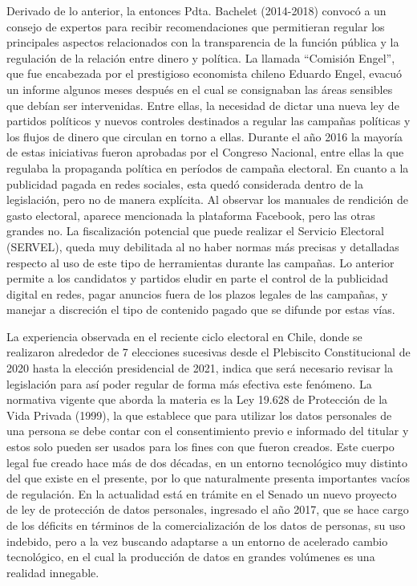 \documentclass[
  10pt,
  letterpaper,
]{report}
\begin{document}
Derivado de lo anterior, la entonces Pdta. Bachelet (2014-2018) convocó
a un consejo de expertos para recibir recomendaciones que permitieran
regular los principales aspectos relacionados con la transparencia de la
función pública y la regulación de la relación entre dinero y política.
La llamada ``Comisión Engel'', que fue encabezada por el prestigioso
economista chileno Eduardo Engel, evacuó un informe algunos meses
después en el cual se consignaban las áreas sensibles que debían ser
intervenidas. Entre ellas, la necesidad de dictar una nueva ley de
partidos políticos y nuevos controles destinados a regular las campañas
políticas y los flujos de dinero que circulan en torno a ellas. Durante
el año 2016 la mayoría de estas iniciativas fueron aprobadas por el
Congreso Nacional, entre ellas la que regulaba la propaganda política en
períodos de campaña electoral. En cuanto a la publicidad pagada en redes
sociales, esta quedó considerada dentro de la legislación, pero no de
manera explícita. Al observar los manuales de rendición de gasto
electoral, aparece mencionada la plataforma Facebook, pero las otras
grandes no. La fiscalización potencial que puede realizar el Servicio
Electoral (SERVEL), queda muy debilitada al no haber normas más precisas
y detalladas respecto al uso de este tipo de herramientas durante las
campañas. Lo anterior permite a los candidatos y partidos eludir en
parte el control de la publicidad digital en redes, pagar anuncios fuera
de los plazos legales de las campañas, y manejar a discreción el tipo de
contenido pagado que se difunde por estas vías.

La experiencia observada en el reciente ciclo electoral en Chile, donde
se realizaron alrededor de 7 elecciones sucesivas desde el Plebiscito
Constitucional de 2020 hasta la elección presidencial de 2021, indica
que será necesario revisar la legislación para así poder regular de
forma más efectiva este fenómeno. La normativa vigente que aborda la
materia es la Ley 19.628 de Protección de la Vida Privada (1999), la que
establece que para utilizar los datos personales de una persona se debe
contar con el consentimiento previo e informado del titular y estos solo
pueden ser usados para los fines con que fueron creados. Este cuerpo
legal fue creado hace más de dos décadas, en un entorno tecnológico muy
distinto del que existe en el presente, por lo que naturalmente presenta
importantes vacíos de regulación. En la actualidad está en trámite en el
Senado un nuevo proyecto de ley de protección de datos personales,
ingresado el año 2017, que se hace cargo de los déficits en términos de
la comercialización de los datos de personas, su uso indebido, pero a la
vez buscando adaptarse a un entorno de acelerado cambio tecnológico, en
el cual la producción de datos en grandes volúmenes es una realidad
innegable.
\end{document}
